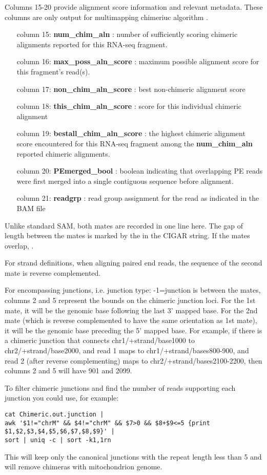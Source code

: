 \documentclass[12pt]{article}
\begin{document}
Columns 15-20 provide alignment score information and relevant metadata. These columns are only output for multimapping chimeriuc algorithm  .
\begin{itemize}[leftmargin=1in]
\item[column 15:] \textbf{num\_chim\_aln} : number of sufficiently scoring chimeric alignments reported for this RNA-seq fragment.
\item[column 16:] \textbf{max\_poss\_aln\_score} : maximum possible alignment score for this fragment's read(s).
\item[column 17:] \textbf{non\_chim\_aln\_score} : best non-chimeric alignment score
\item[column 18:] \textbf{this\_chim\_aln\_score} : score for this individual chimeric alignment
\item[column 19:] \textbf{bestall\_chim\_aln\_score} : the highest chimeric alignment score encountered for this RNA-seq fragment among the \textbf{num\_chim\_aln} reported chimeric alignments.
\item[column 20:] \textbf{PEmerged\_bool} : boolean indicating that overlapping PE reads were first merged into a single contiguous sequence before alignment.
\item[column 21:] \textbf{readgrp} : read group assignment for the read as indicated in the BAM file
\end{itemize}

Unlike standard SAM, both mates are recorded in one line here. The gap of length   between the mates is marked by the  in the CIGAR string.
If the mates overlap, . 

For strand definitions, when aligning paired end reads, the sequence of the second mate is reverse complemented.

For encompassing junctions, i.e. junction type: -1=junction is between the mates, columns 2 and 5 represent the bounds on the chimeric junction loci. For the 1st mate, it will be the genomic base following the last 3' mapped base. For the 2nd mate (which is reverse complemented to have the same orientation as 1st mate), it will be the genomic base preceding the 5' mapped base. For example, if there is a chimeric junction that connects chr1/+strand/base1000 to chr2/+strand/base2000, and read 1 maps to chr1/+strand/bases800-900, and read 2 (after reverse complementing) maps to chr2/+strand/bases2100-2200, then columns 2 and 5 will have 901 and 2099.

To filter chimeric junctions and find the number of reads supporting each junction you could use, for example:
\begin{verbatim}
cat Chimeric.out.junction | 
awk '$1!="chrM" && $4!="chrM" && $7>0 && $8+$9<=5 {print $1,$2,$3,$4,$5,$6,$7,$8,$9}' | 
sort | uniq -c | sort -k1,1rn
\end{verbatim}
This will keep only the canonical junctions with the repeat length less than 5 and will remove chimeras with mitochondrion genome.
\end{document}
